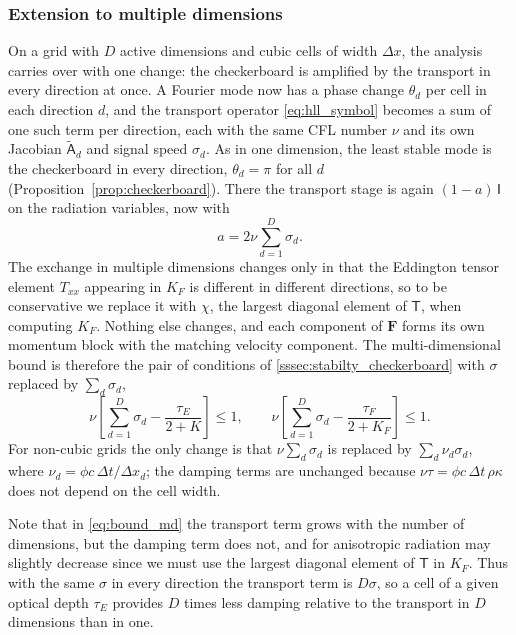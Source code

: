 \documentclass[preprint,12pt,authoryear]{elsarticle}
\newcommand{\vecF}{\mathbf{F}}
\newcommand{\tenA}{\mathsf{A}}
\newcommand{\tenI}{\mathsf{I}}
\begin{document}
\subsubsection{Extension to multiple dimensions}
\label{sssec:md}

On a grid with $D$ active dimensions and cubic cells of width $\Delta x$, the analysis carries over with one change: the checkerboard is amplified by the transport in every direction at once. A Fourier mode now has a phase change $\theta_d$ per cell in each direction $d$, and the transport operator \autoref{eq:hll_symbol} becomes a sum of one such term per direction, each with the same CFL number $\nu$ and its own Jacobian $\tilde{\tenA}_d$ and signal speed $\sigma_d$. As in one dimension, the least stable mode is the checkerboard in every direction, $\theta_d = \pi$ for all $d$ (Proposition~\ref{prop:checkerboard}). There the transport stage is again $(1 - a)\,\tenI$ on the radiation variables, now with
\begin{equation}
    a = 2\nu\sum_{d=1}^{D}\sigma_d .
    \label{eq:a_md}
\end{equation}
The exchange in multiple dimensions changes only in that the Eddington tensor element $T_{xx}$ appearing in $K_F$ is different in different directions, so to be conservative we replace it with $\chi$, the largest diagonal element of $\mathsf{T}$, when computing $K_F$. Nothing else changes, and each component of $\vecF$ forms its own momentum block with the matching velocity component. The multi-dimensional bound is therefore the pair of conditions of \autoref{sssec:stabilty_checkerboard} with $\sigma$ replaced by $\sum_d\sigma_d$,
\begin{equation}
    \nu\left[\sum_{d=1}^{D}\sigma_d - \frac{\tau_E}{2 + K}\right] \leq 1,
    \qquad
    \nu\left[\sum_{d=1}^{D}\sigma_d - \frac{\tau_F}{2 + K_F}\right] \leq 1 .
    \label{eq:bound_md}
\end{equation}
For non-cubic grids the only change is that $\nu\sum_d\sigma_d$ is replaced by $\sum_d\nu_d\sigma_d$, where $\nu_d = \phi c\,\Delta t/\Delta x_d$; the damping terms are unchanged because $\nu\tau = \phi c\,\Delta t\,\rho\kappa$ does not depend on the cell width.

Note that in \autoref{eq:bound_md} the transport term grows with the number of dimensions, but the damping term does not, and for anisotropic radiation may slightly decrease since we must use the largest diagonal element of $\mathsf{T}$ in $K_F$. Thus with the same $\sigma$ in every direction the transport term is $D\sigma$, so a cell of a given optical depth $\tau_E$ provides $D$ times less damping relative to the transport in $D$ dimensions than in one.
\end{document}
